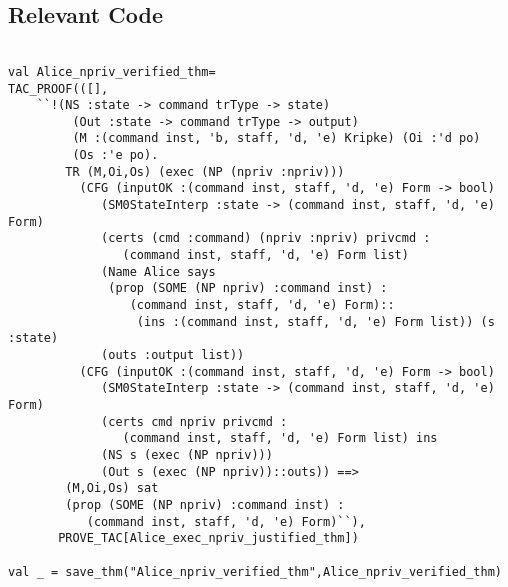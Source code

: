 \documentclass{report}
\begin{document}
\subsection{Relevant Code}
\label{rel-code-3}
\begin{lstlisting}[frame=TBlr]

val Alice_npriv_verified_thm=
TAC_PROOF(([],
	``!(NS :state -> command trType -> state)
         (Out :state -> command trType -> output)
         (M :(command inst, 'b, staff, 'd, 'e) Kripke) (Oi :'d po)
         (Os :'e po).
        TR (M,Oi,Os) (exec (NP (npriv :npriv)))
          (CFG (inputOK :(command inst, staff, 'd, 'e) Form -> bool)
             (SM0StateInterp :state -> (command inst, staff, 'd, 'e) Form)
             (certs (cmd :command) (npriv :npriv) privcmd :
                (command inst, staff, 'd, 'e) Form list)
             (Name Alice says
              (prop (SOME (NP npriv) :command inst) :
                 (command inst, staff, 'd, 'e) Form)::
                  (ins :(command inst, staff, 'd, 'e) Form list)) (s :state)
             (outs :output list))
          (CFG (inputOK :(command inst, staff, 'd, 'e) Form -> bool)
             (SM0StateInterp :state -> (command inst, staff, 'd, 'e) Form)
             (certs cmd npriv privcmd :
                (command inst, staff, 'd, 'e) Form list) ins
             (NS s (exec (NP npriv)))
             (Out s (exec (NP npriv))::outs)) ==>
        (M,Oi,Os) sat
        (prop (SOME (NP npriv) :command inst) :
           (command inst, staff, 'd, 'e) Form)``),
	   PROVE_TAC[Alice_exec_npriv_justified_thm])

val _ = save_thm("Alice_npriv_verified_thm",Alice_npriv_verified_thm)

\end{lstlisting}
\end{document}
